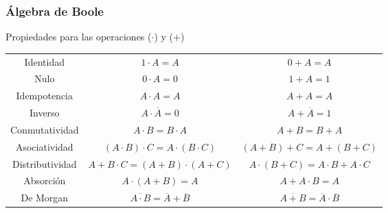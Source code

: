 \documentclass[aspectratio=169]{beamer}
\begin{document}
\begin{frame}[fragile]
    \frametitle{Álgebra de Boole}
    Propiedades para las operaciones ($\cdot$) y ($+$)
    \begin{center}
    \renewcommand{\arraystretch}{1.5}
    \begin{tabular}[h]{|c|c|c|} \rowcolor{gray!15}
    \hline
    Identidad       &      $1 \cdot A=A$                             &     $0+A=A$                  \\
    Nulo            &      $0 \cdot A=0$                             &     $1+A=1$                  \\ \rowcolor{gray!15}
    Idempotencia    &      $A \cdot A=A$                             &     $A+A=A$                  \\ 
    Inverso         &      $A \cdot \overline{A}=0$                  &     $A+\overline{A}=1$       \\ \rowcolor{gray!15}     
    Conmutatividad  &      $A \cdot B=B \cdot A$                     &     $A+B=B+A$                \\
    Asociatividad   &      $(A \cdot B) \cdot C=A \cdot (B \cdot C)$ &     $(A+B)+C=A+(B+C)$        \\ \rowcolor{gray!15}
    Distributividad &      $A + B \cdot C = (A+B) \cdot (A+C)$       &     $A \cdot (B+C)=A \cdot B+A \cdot C$        \\
    Absorci\'on     &      $A \cdot (A+B)=A$                         &     $A+A \cdot B = A$              \\ \rowcolor{gray!15}
    De Morgan       & $\overline{A \cdot B} = \overline{A} + \overline{B}$ & $\overline{A+B} = \overline{A} \cdot \overline{B}$ \\
    \hline
    \end{tabular}
    \end{center}
\end{frame}
\end{document}
